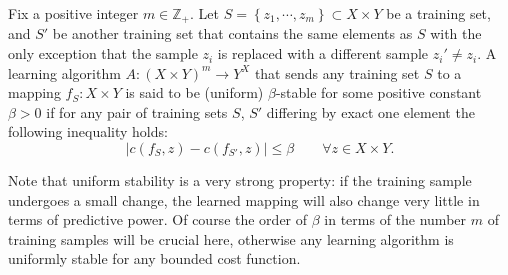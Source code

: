 \documentclass[letterpaper]{article} %
\begin{document}
\begin{definition}
  \label{defn:uniform-stability}
  Fix a positive integer $m\in\mathbb{Z}_+$. Let $S=\left\{ z_1,\cdots,z_m \right\}\subset X\times Y$ be a training set, and $S'$ be another training set that contains the same elements as $S$ with the only exception that the sample $z_i$ is replaced with a different sample $z_i'\neq z_i$. A learning algorithm $A:\left( X\times Y \right)^m\rightarrow Y^X$ that sends any training set $S$ to a mapping $f_S:X\times Y$ is said to be (uniform) $\beta$-stable for some positive constant $\beta>0$ if for any pair of training sets $S$, $S'$ differing by exact one element the following inequality holds:
  \begin{equation*}
    \left| c \left( f_S,z \right)-c\left(f_{S'},z\right) \right|\leq \beta\qquad\forall z\in X\times Y.
  \end{equation*}
\end{definition}
Note that uniform stability is a very strong property: if the training sample undergoes a small change, the learned mapping will also change very little in terms of predictive power. Of course the order of $\beta$ in terms of the number $m$ of training samples will be crucial here, otherwise any learning algorithm is uniformly stable for any bounded cost function.
\end{document}
